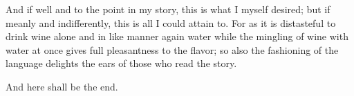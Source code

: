 {And if
{} well and to the point in my story, this is what I myself desired; but if meanly and indifferently, this is all I could attain to.
For as it is
 distasteful to drink wine alone and in like manner again
{} water
{}
 while the mingling of wine with water at once
 gives full pleasantness to the flavor; so also the fashioning of the language delights the ears of those who read the story.
\par }{\PP And here shall be the end.
\par }